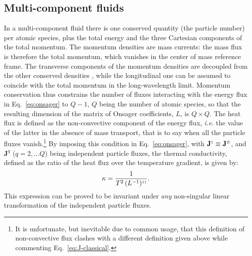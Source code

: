 \subsection{Multi-component fluids} \label{sec:multi-component}
In a multi-component fluid there is one conserved quantity (the particle number) per atomic species, plus the total energy and the three Cartesian components of the total momentum. The momentum densities are mass currents: the mass flux is therefore the total momentum, which vanishes in the center of mass reference frame. The transverse components of the momentum densities are decoupled from the other conserved densities \cite{Foster1975}, while the longitudinal one can be assumed to coincide with the total momentum in the long-wavelength limit. Momentum conservation thus constrains the number of fluxes interacting with the energy flux in Eq.~\eqref{eq:onsager} to $Q-1$, $Q$ being the number of atomic species, so that the resulting dimension of the matrix of Onsager coefficients, $L$, is $Q\times Q$. The heat flux is defined as the non-convective component of the energy flux, \emph{i.e.} the value of the latter in the absence of mass transport, that is to say when all the particle fluxes vanish.\footnote{It is unfortunate, but inevitable due to common usage, that this definition of non-convective flux clashes with a different definition given above while commenting Eq.~\eqref{eq:J-classical}.} By imposing this condition in Eq.~\eqref{eq:onsager}, with $\mathbf J^{\scriptscriptstyle 1} \equiv \mathbf{J}^{\scriptscriptstyle E}$, and $\mathbf{J}^{q}$ ($q =2,\dots Q$) being independent particle fluxes, the thermal conductivity, defined as the ratio of the heat flux over the temperature gradient, is given by:
\begin{equation}
\kappa = \frac{1}{T^2 \,(L^{-1})^{\smallone\smallone}}. \label{eq:multi_kappa}
\end{equation}
This expression can be proved to be invariant under \textit{any} non-singular linear transformation of the independent particle fluxes. 


